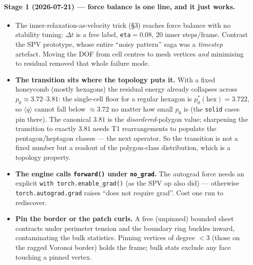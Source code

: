 \documentclass[11pt]{article}
\begin{document}
\paragraph{Stage 1 (2026-07-21) --- force balance is one line, and it just works.}
\begin{itemize}\itemsep2pt
\item The inner-relaxation-as-velocity trick (\S3) reaches force balance with no stability
tuning: $\Delta t$ is a free label, \texttt{eta}$=0.08$, $20$ inner steps/frame. Contrast the
SPV prototype, whose entire ``noisy pattern'' saga was a \emph{timestep} artefact. Moving the
DOF from cell centres to mesh vertices \emph{and} minimising to residual removed that whole
failure mode.
\item \textbf{The transition sits where the topology puts it.} With a fixed honeycomb (mostly
hexagons) the residual energy already collapses across $p_0\!\approx\!3.72$--$3.81$: the
single-cell floor for a regular hexagon is $p_0^\ast(\text{hex})=3.722$, so $\langle q\rangle$
cannot fall below $\approx\!3.72$ no matter how small $p_0$ is (the \texttt{solid} cases pin
there). The canonical $3.81$ is the \emph{disordered}-polygon value; sharpening the transition
to exactly $3.81$ needs T1 rearrangements to populate the pentagon/heptagon classes --- the next
operator. So the transition is not a fixed number but a readout of the polygon-class
distribution, which is a topology property.
\item \textbf{The engine calls \texttt{forward()} under \texttt{no\_grad}.} The autograd force
needs an explicit \texttt{with torch.enable\_grad()} (as the SPV op also did) --- otherwise
\texttt{torch.autograd.grad} raises ``does not require grad''. Cost one run to rediscover.
\item \textbf{Pin the border or the patch curls.} A free (unpinned) bounded sheet contracts
under perimeter tension and the boundary ring buckles inward, contaminating the bulk statistics.
Pinning vertices of degree $<3$ (those on the ragged Voronoi border) holds the frame; bulk stats
exclude any face touching a pinned vertex.
\end{itemize}
\end{document}
